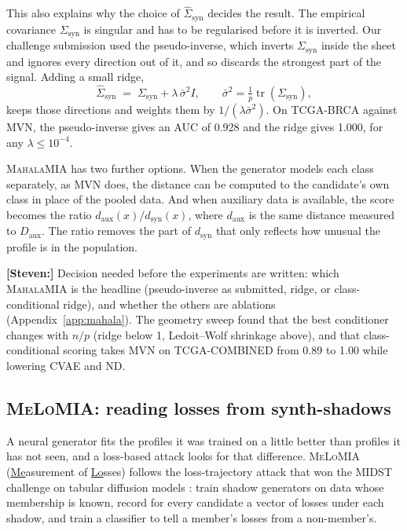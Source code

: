 \documentclass[webpdf,contemporary,large]{oup-authoring-template}
\newif\ifdraft \drafttrue
\newcommand{\annot}[3]{\ifdraft\textcolor{#1}{\textbf{[#2:]} #3}\fi}
\newcommand{\steven}[1]{\annot{Periwinkle}{Steven}{#1}}
\newcommand{\Daux}{D_{\mathrm{aux}}}
\newcommand{\Sigsyn}{\Sigma_{\mathrm{syn}}}
\newcommand{\mahala}{\textsc{MahalaMIA}}
\newcommand{\melo}{\textsc{MeLoMIA}}
\begin{document}
This also explains why the choice of $\widehat{\Sigma}_{\mathrm{syn}}$ decides the result. The empirical covariance $\Sigsyn$ is singular and has to be regularised before it is inverted. Our challenge submission used the pseudo-inverse, which inverts $\Sigsyn$ inside the sheet and ignores every direction out of it, and so discards the strongest part of the signal. Adding a small ridge,
\begin{equation}
  \widehat{\Sigma}_{\mathrm{syn}} \;=\; \Sigsyn + \lambda\, \bar{\sigma}^2 I , \qquad \bar{\sigma}^2 = \tfrac{1}{p}\operatorname{tr}(\Sigsyn),
  \label{eq:ridge}
\end{equation}
keeps those directions and weights them by $1/(\lambda \bar{\sigma}^2)$. On TCGA-BRCA against MVN, the pseudo-inverse gives an AUC of 0.928 and the ridge gives 1.000, for any $\lambda \le 10^{-4}$.

\mahala{} has two further options. When the generator models each class separately, as MVN does, the distance can be computed to the candidate's own class in place of the pooled data. And when auxiliary data is available, the score becomes the ratio $d_{\mathrm{aux}}(x)/d_{\mathrm{syn}}(x)$, where $d_{\mathrm{aux}}$ is the same distance measured to $\Daux$. The ratio removes the part of $d_{\mathrm{syn}}$ that only reflects how unusual the profile is in the population.

\steven{Decision needed before the experiments are written: which \mahala{} is the headline (pseudo-inverse as submitted, ridge, or class-conditional ridge), and whether the others are ablations (Appendix~\ref{app:mahala}). The geometry sweep found that the best conditioner changes with $n/p$ (ridge below 1, Ledoit--Wolf shrinkage above), and that class-conditional scoring takes MVN on TCGA-COMBINED from 0.89 to 1.00 while lowering CVAE and ND.}

\subsection{\melo{}: reading losses from synth-shadows}
\label{sec:melomia}

A neural generator fits the profiles it was trained on a little better than profiles it has not seen, and a loss-based attack looks for that difference. \melo{} (\underline{Me}asurement of \underline{Lo}sses) follows the loss-trajectory attack that won the MIDST challenge on tabular diffusion models \citep{wu2025winning}: train shadow generators on data whose membership is known, record for every candidate a vector of losses under each shadow, and train a classifier to tell a member's losses from a non-member's.
\end{document}
